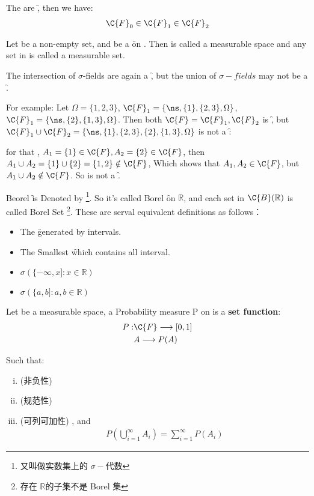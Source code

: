 The  are \f, then we have:
\begin{align*}
    \C{F}_0\in \C{F}_1 \in \C{F}_2
\end{align*} 

Let \om be a non-empty set, and  be a \f on \om. Then 
is called a measurable space and any set in  is called a measurable set.

The intersection of $\sigma$-fields are again a \f, but the union of $\sigma-fields$ 
may not be a \f. 

For example: Let $\Omega = \{1, 2, 3\}$, $\C{F}_1 = \{\ns, \{1\}, \{2, 3\}, \Omega\}$,
$\C{F}_1 = \{\ns, \{2\}, \{1, 3\}, \Omega\}$. Then both $\C{F} = \C{F}_1, \C{F}_2$ is \f, but
$\C{F}_1\cup\C{F}_2 = \{\ns, \{1\}, \{2, 3\}, \{2\}, \{1, 3\}, \Omega\}$  is not a \f:

for that , $A_1= \{1\}\in \C{F}, A_2=\{2\}\in \C{F}$, then $A_1\cup A_2=\{1\}\cup \{2\} = \{1, 2\}\notin \C{F}$, Which shows that $A_1, A_2\in \C{F}$, but $A_1\cup A_2\notin\C{F}$.
So  is not a \f.

Beorel \f is Denoted by \footnote[3]{又叫做实数集上的 $\sigma-$代数}.
So it's called Borel \f on $\mathbb{R}$, and each set in $\C{B}(\mathbb R) $ is called Borel Set
\footnote[4]{存在 $\mathbb R$的子集不是 Borel 集}.
These are serval equivalent definitions as follows：

\begin{itemize}
    \item The \f generated by intervals.
    \item The Smallest \f which contains all interval.
    \item $\sigma(\{-\infty, x]: x\in \mathbb R)$
    \item $\sigma(\{a, b]: a, b \in\mathbb R)$
\end{itemize}

\begin{definition}
    Let  be  a measurable space, a Probability measure P on   
is a \textbf{set function}:
\begin{align}
    P: & \C{F} \longrightarrow [0, 1]\notag\\
       & A  \longrightarrow P(A) 
\end{align} 
\end{definition}


Such that:
\begin{enumerate}[(i)]
    \item (非负性) 
    \item (规范性)  
    \item (可列可加性) , and  
        \begin{align}
            P(\bigcup_{i=1}^\infty A_i) = \sum_{i=1}^{\infty}{P(A_i)}
        \end{align}
\end{enumerate} 

